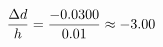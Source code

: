 \documentclass[preview]{standalone}
\begin{document}
\begin{align*}
\special{dvisvgm:raw <g id='unique000'>}\frac{\Delta d}{h} = \frac{-0.0300}{0.01} \approx -3.00\special{dvisvgm:raw </g>}
\end{align*}
\end{document}
